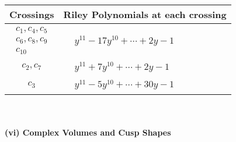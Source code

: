 \documentclass[1p]{elsarticle_modified}
\theoremstyle{definition}
\begin{document}
\begin{tabular}{m{50pt}|m{274pt}}
Crossings & \hspace{64pt}Riley Polynomials at each crossing \\
\hline $$\begin{aligned}c_{1},c_{4},c_{5}\\c_{6},c_{8},c_{9}\\c_{10}\end{aligned}$$&$\begin{aligned}
&y^{11}-17 y^{10}+\cdots+2 y-1
\end{aligned}$\\
\hline $$\begin{aligned}c_{2},c_{7}\end{aligned}$$&$\begin{aligned}
&y^{11}+7 y^{10}+\cdots+2 y-1
\end{aligned}$\\
\hline $$\begin{aligned}c_{3}\end{aligned}$$&$\begin{aligned}
&y^{11}-5 y^{10}+\cdots+30 y-1
\end{aligned}$\\
\hline
\end{tabular}\\~\\
\newpage\flushleft \textbf{(vi) Complex Volumes and Cusp Shapes}
\end{document}
